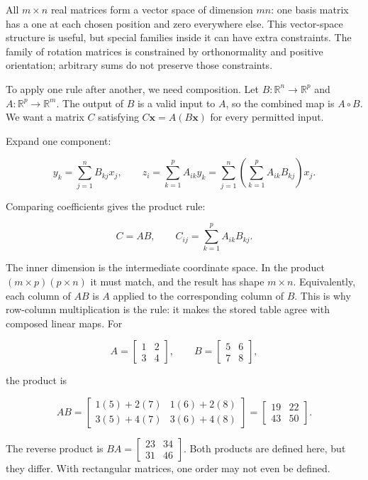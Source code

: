 All \(m\times n\) real matrices form a vector space of dimension \(mn\): one basis matrix has a one at each chosen position and zero everywhere else. This vector-space structure is useful, but special families inside it can have extra constraints. The family of rotation matrices is constrained by orthonormality and positive orientation; arbitrary sums do not preserve those constraints.

To apply one rule after another, we need composition. Let \(B:\mathbb R^n\to\mathbb R^p\) and \(A:\mathbb R^p\to\mathbb R^m\). The output of \(B\) is a valid input to \(A\), so the combined map is \(A\circ B\). We want a matrix \(C\) satisfying \(C\mathbf x=A(B\mathbf x)\) for every permitted input.

Expand one component:

\[
y_k=\sum_{j=1}^{n}B_{kj}x_j,
\qquad
z_i=\sum_{k=1}^{p}A_{ik}y_k
=\sum_{j=1}^{n}\left(\sum_{k=1}^{p}A_{ik}B_{kj}\right)x_j.
\]

Comparing coefficients gives the product rule:

\[
C=AB,\qquad C_{ij}=\sum_{k=1}^{p}A_{ik}B_{kj}.
\]

The inner dimension is the intermediate coordinate space. In the product \((m\times p)(p\times n)\) it must match, and the result has shape \(m\times n\). Equivalently, each column of \(AB\) is \(A\) applied to the corresponding column of \(B\). This is why row-column multiplication is the rule: it makes the stored table agree with composed linear maps. For

\[
A=\begin{bmatrix}1&2\\3&4\end{bmatrix},\qquad
B=\begin{bmatrix}5&6\\7&8\end{bmatrix},
\]

the product is

\[
AB=\begin{bmatrix}1(5)+2(7)&1(6)+2(8)\\3(5)+4(7)&3(6)+4(8)\end{bmatrix}
=\begin{bmatrix}19&22\\43&50\end{bmatrix}.
\]

The reverse product is \(BA=\begin{bmatrix}23&34\\31&46\end{bmatrix}\). Both products are defined here, but they differ. With rectangular matrices, one order may not even be defined.

